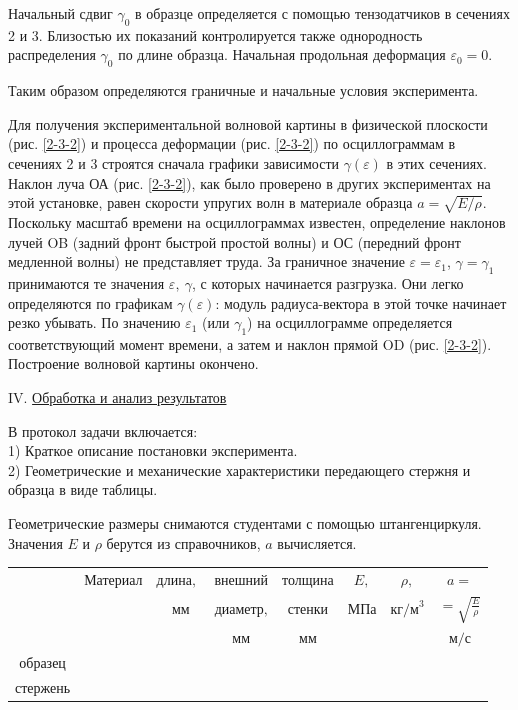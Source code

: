\documentclass[specialist, subf, href, colorlinks=true, 14pt, final]{disser}
\theoremstyle{definition}
\newcommand{\npart}[2]{\noindent #1. \underline{#2}}
\begin{document}
Начальный сдвиг $\gamma_0$ в образце определяется с помощью тензодатчиков в сечениях 2 и 3. Близостью их показаний контролируется также однородность распределения $\gamma_0$ по длине образца. Начальная продольная деформация $\varepsilon_{0} = 0$.

Таким образом определяются граничные и начальные условия
эксперимента.

Для получения экспериментальной волновой картины в физической плоскости (рис. \ref{2-3-2}) и процесса деформации (рис. \ref{2-3-2}) по осциллограммам в сечениях 2 и 3 строятся сначала графики зависимости $\gamma(\varepsilon)$ в этих сечениях. Наклон луча ОА (рис. \ref{2-3-2}), как было проверено в других экспериментах на этой установке, равен скорости упругих волн в материале образца $a = \sqrt{E/\rho}$. Поскольку масштаб времени на осциллограммах известен, определение наклонов лучей OB (задний фронт быстрой простой волны) и ОС (передний фронт медленной волны) не представляет труда. За граничное значение $\varepsilon = \varepsilon_1$, $\gamma = \gamma_1$ принимаются те значения $\varepsilon,\ \gamma$, с которых начинается разгрузка. Они легко определяются по графикам $\gamma(\varepsilon)$: модуль радиуса-вектора в этой точке начинает резко убывать. По значению $\varepsilon_1$ (или $\gamma_1$) на осциллограмме определяется соответствующий момент времени, а затем и наклон прямой OD (рис. \ref{2-3-2}). Построение волновой картины окончено.

\npart{IV}{Обработка и анализ результатов}

В протокол задачи включается:\\
1) Краткое описание постановки эксперимента.\\
2) Геометрические и механические характеристики передающего
стержня и образца в виде таблицы.

Геометрические размеры снимаются студентами с помощью штангенциркуля. Значения $E$ и $\rho$ берутся из справочников, $a$ вычисляется.

\begin{center}
		\begin{tabular}{|c|c|c|c|c|c|c|c|}
			 \hline
			 & $\text{Материал}$ & $\text{длина, }$ & $\text{внешний}$ & $\text{толщина}$ & $E,$ & $\rho,$ & $a = $\\

			 &  & $\text{ мм}$ & $\text{диаметр,}$ & $\text{стенки}$ & $\text{МПа}$ & $\text{кг/м}^3$ & $ = \sqrt{\frac{E}{\rho}}$\\

			 & &  & $\text{мм}$ & $\text{мм}$ &  &  & $\text{м/с}$\\
			 \hline
			 $\text{образец}$&&&&&&&\\ \hline
			$\text{стержень}$&&&&&&&\\ \hline
			
		\end{tabular} 
\end{center}
\end{document}
